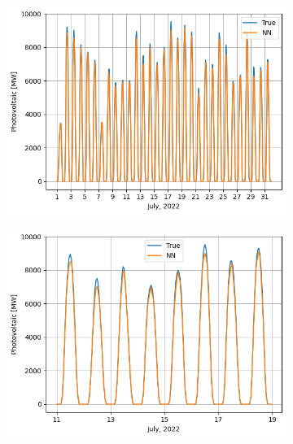 \documentclass{article}
\begin{document}
\begin{figure}[t]
  \centering
  \begin{subfigure}{.45\textwidth}
    \centering
    \includegraphics[width=1\linewidth]{solar-1.png}
    \caption{}
    \label{fig:solar-1}
  \end{subfigure}%
  \begin{subfigure}{.45\textwidth}
    \centering
    \includegraphics[width=1\linewidth]{solar-1-zoom.png}
    \caption{}
    \label{fig:solar-1-zoom}
  \end{subfigure}
  \begin{subfigure}{.45\textwidth}
    \centering

\end{subfigure}
\end{figure}
\end{document}
